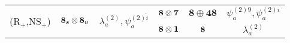 {\begin{tabular}{|cccccc|}
    \multicolumn{1}{|c|}{\multirow{2}{*}{(R$_+$,NS$_+$)}}  & \multicolumn{1}{c|}{\multirow{2}{*}{$\boldsymbol{8_s}\otimes\boldsymbol{8_v}$}}   & \multicolumn{1}{c|}{\multirow{2}{*}{${\lambda}_a^{(2)}, {\psi}^{(2)\hat{i}}_a$}}         & \multicolumn{1}{c|}{$\boldsymbol{8}\otimes\boldsymbol{7}$}                            & \multicolumn{1}{c|}{$\boldsymbol{8} \oplus\boldsymbol{48}$}                           & $\psi^{(2)9}_a, \psi^{(2)i}_a$       \\ \cline{4-6} 
    \multicolumn{1}{|c|}{}                                 & \multicolumn{1}{c|}{}                                 & \multicolumn{1}{c|}{}                                                                    & \multicolumn{1}{c|}{$\boldsymbol{8} \otimes \boldsymbol{1}$}                              & \multicolumn{1}{c|}{$\boldsymbol{8}$}                                                         & $\lambda^{(2)}_a$                    \\ \hline
    \end{tabular}
}